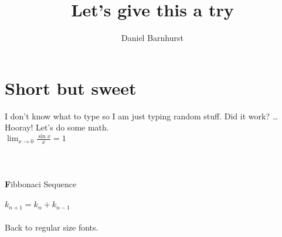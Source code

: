 \documentclass[letterpaper,12pt]{article}
\author{Daniel Barnhurst}
\title{Let's give this a try}
\begin{document}
\maketitle
\tableofcontents
\section{Short but sweet}
I don't know what to type so
I am just typing random stuff.\newline
Did it work?\newline
\ldots{}
\newline
Hooray!
\newline
Let's do some math.
\newline
\\
\Huge \(\lim_{x \to 0} \frac{\sin x}{x} = 1\)
\\
\\
\pi {}
\\
\\
\textbf Fibbonaci Sequence\\
\\
\(k_{n+1} = k_{n} + k_{n-1}\)
\\
\\
\normal Back to regular size fonts.
\end{document}
